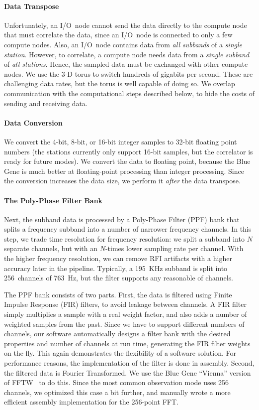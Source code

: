 \paragraph{Data Transpose }
Unfortunately, an I/O~node cannot send the data directly to the compute node
that must correlate the data, since an I/O~node is connected to only a few
compute nodes.
Also, an I/O~node contains data from \emph{all subbands\/} of a \emph{single
station}.
However, to correlate, a compute node needs data from a \emph{single subband\/}
of \emph{all stations}.
Hence, the sampled data must be exchanged with other compute nodes.
We use the 3-D torus to switch hundreds of gigabits per second.
These are challenging data rates, but the torus is well capable of doing so.
We overlap communication with the computational steps described below,
to hide the costs of sending and receiving data.


\paragraph{Data Conversion}
We convert the 4-bit, 8-bit, or 16-bit integer samples to 32-bit
floating point numbers (the stations currently only support 16-bit samples,
but the correlator is ready for future modes).
We convert the data to floating point, because the Blue Gene is much better at
floating-point processing than integer processing.
Since the conversion increases the data size, we perform it \emph{after\/} the
data transpose.


\paragraph{The Poly-Phase Filter Bank }
Next, the subband data is processed by a Poly-Phase Filter (PPF) bank that
splits a frequency subband into a number of narrower frequency channels.
In this step, we trade time resolution for frequency resolution: we split a
subband into $N$ separate channels, but with an $N$-times lower sampling rate
per channel.
With the higher frequency resolution, we can remove RFI artifacts with a
higher accuracy later in the pipeline.
Typically, a 195~KHz subband is split into 256~channels of 763~Hz, but the
filter supports any reasonable of channels.

The PPF bank consists of two parts.
First, the data is filtered using Finite Impulse Response (FIR) filters,
to avoid leakage between channels.
A FIR filter simply multiplies a sample with a real weight factor, and
also adds a number of weighted samples from the past.
Since we have to support different numbers of channels, our software
automatically designs a filter bank with the desired properties and number
of channels at run time, generating the FIR filter weights on the fly.
This again demonstrates the flexibility of a software solution.
For performance reasons, the implementation of the filter is done in assembly.
Second, the filtered data is Fourier Transformed.
We use the Blue Gene ``Vienna'' version of FFTW~\cite{Lorenz:05} to do this.
Since the most common observation mode uses 256 channels, we optimized this
case a bit further, and manually wrote a more efficient assembly
implementation for the 256-point FFT.

